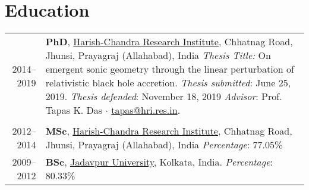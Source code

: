 \documentclass[12pt]{article}
\begin{document}
\section{Education}
\begin{tabular}{rp{14cm}}
  2014--2019 & {\sffamily \bfseries PhD}, \href{http://www.hri.res.in/}{Harish-Chandra Research Institute},
              Chhatnag Road, Jhunsi, Prayagraj (Allahabad), India\newline
              {\itshape Thesis Title:} On emergent sonic geometry through the linear perturbation of relativistic black hole accretion.\newline 
              {\itshape Thesis submitted}: June 25, 2019. {\itshape Thesis defended}: November 18, 2019\newline
              {\itshape Advisor}: Prof. Tapas K. Das $\cdot$ \href{mailto:tapas@hri.res.in}{tapas@hri.res.in}.\\ \\
  2012--2014 & {\sffamily \bfseries MSc}, \href{http://www.hri.res.in/}{Harish-Chandra Research Institute}, Chhatnag Road, Jhunsi, Prayagraj (Allahabad), India\newline
              {\itshape Percentage}: 77.05\%\newline\\
  2009--2012 & {\sffamily \bfseries BSc}, \href{http://www.jaduniv.edu.in/}{Jadavpur University}, Kolkata, India.\newline
              {\itshape Percentage}: 80.33\%
\end{tabular}


\end{document}
